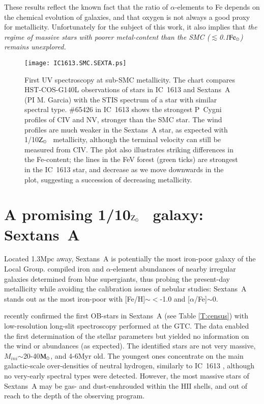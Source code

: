 \documentclass{iau}
\newcommand{\Msun}{$\rm M_{\odot}$}
\newcommand{\Fesun}{$\rm Fe_{\odot}$}
\newcommand{\Zsun}{$\rm Z_{\odot}$}
\newcommand{\Mini}{\mbox{$M_{ini}$}}
\begin{document}
These results reflect the known fact that the ratio of $\alpha$-elements to Fe
depends on the chemical evolution of galaxies,
and that oxygen is not always a good proxy for metallicity.
Unfortunately for the subject of this work,
it also implies that
\textit{the regime of massive
stars with poorer metal-content than the SMC  ($\lesssim$0.1\Fesun) remains unexplored.}


\begin{figure}[]
\begin{center}
 \texttt{[image: IC1613.SMC.SEXTA.ps]} 
 \caption{First UV spectroscopy at sub-SMC metallicity. The chart compares
   HST-COS-G140L observations of stars in IC~1613 and Sextans~A  (PI M. Garcia)
   with the STIS spectrum of a star with similar spectral type.
   \#65426 in IC~1613 shows the strongest P~Cygni profiles of CIV and NV,
   stronger than the SMC star.
   The wind profiles are much weaker in the Sextans~A star,
   as expected with 1/10\Zsun~ metallicity, although the
   terminal velocity can still be measured from CIV.
   The plot also illustrates striking differences in the Fe-content;
   the lines in the FeV forest (green ticks) are strongest in the IC~1613 star,
   and decrease as we move downwards in the plot, suggesting a
   succession of decreasing metallicity.
 }
   \label{F:UV}
\end{center}
\end{figure}


\section{A promising 1/10\Zsun~ galaxy: Sextans~A}
\label{s:sexta}

Located 1.3Mpc away, Sextans~A is potentially the most iron-poor galaxy of the
Local Group.
\citet{Hal14} compiled iron and $\alpha$-element abundances of
nearby irregular galaxies determined from blue supergiants,
thus probing the present-day metallicity while avoiding the calibration
issues of nebular studies:  %
Sextans~A stands out as the most iron-poor with [Fe/H]$\sim <$-1.0 and [$\alpha$/Fe]$\sim$0.

 \citet{Cal16} recently confirmed the first OB-stars in Sextans~A (see Table \ref{T:census})
with low-resolution long-slit spectroscopy performed at the GTC.
The data enabled the first determination of the
stellar parameters but yielded no information on the wind or abundances (as expected).
The identified stars are not very massive, \Mini$\sim$20-40\Msun, and 4-6Myr old.
The youngest ones concentrate on the main galactic-scale over-densities of neutral
hydrogen, similarly to IC~1613 \citep{Gal10}, although no very-early spectral types
were detected.
However, the most massive stars of Sextans~A may be
gas- and dust-enshrouded within the HII shells,
and out of reach to the depth of the observing program.
\end{document}

